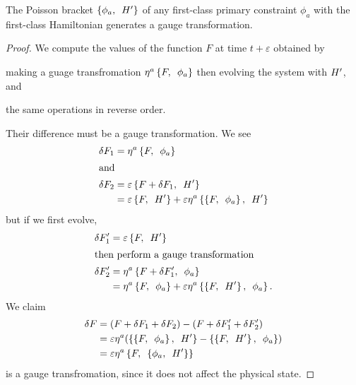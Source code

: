 \begin{lemma}
The Poisson bracket $\left\{\phi_{a},\enspace H'\right\}$
of any first-class primary constraint $\phi_{a}$ with the first-class
Hamiltonian generates a gauge transformation.
\end{lemma}

\begin{proof}
We compute the values of the function $F$ at time $t+\varepsilon$
obtained by
\begin{enumerate*}[label=(\em\roman*\/\upshape)]
\item making a guage transfromation
  $\eta^{a}\left\{F,\enspace\phi_{a}\right\}$ then evolving the system with
  $H'$, and
\item the same operations in reverse order.
\end{enumerate*}
Their difference must be a gauge transformation. We see 
\begin{subequations}
\begin{align}
\delta F_{1} &= \eta^{a}\left\{F,\enspace\phi_{a}\right\}\\
\intertext{and}
\delta F_{2} &= \varepsilon\left\{F+\delta F_{1},\enspace H'\right\}\\
&=\varepsilon\left\{F,\enspace H'\right\} + \varepsilon\eta^{a}\left\{\left\{F,\enspace\phi_{a}\right\},\enspace H'\right\}
\end{align}
\end{subequations}
but if we first evolve, 
\begin{subequations}
\begin{align}
\delta F_{1}' &= \varepsilon\left\{F,\enspace H'\right\}\\
\intertext{then perform a gauge transformation}
\delta F_{2}' &= \eta^{a}\left\{F+\delta F_{1}',\enspace\phi_{a}\right\}\\
&= \eta^{a}\left\{F,\enspace\phi_{a}\right\}+\varepsilon\eta^{a}\left\{\left\{F,\enspace H'\right\},\enspace\phi_{a}\right\}.
\end{align}
\end{subequations}
We claim
\begin{subequations}
\begin{align}
\delta F &= (F+\delta F_{1}+\delta F_{2}) - (F + \delta F_{1}' + \delta F_{2}')\\
&= \varepsilon\eta^{a}(\left\{\left\{F,\enspace\phi_{a}\right\},\enspace H'\right\}
-\left\{\left\{F,\enspace H'\right\},\enspace\phi_{a}\right\})\\
&= \varepsilon\eta^{a}\left\{F,\enspace\left\{\phi_{a},\enspace H'\right\}\right\}
\end{align}
\end{subequations}
is a gauge transfromation, since it does not affect the physical state.
\end{proof}

